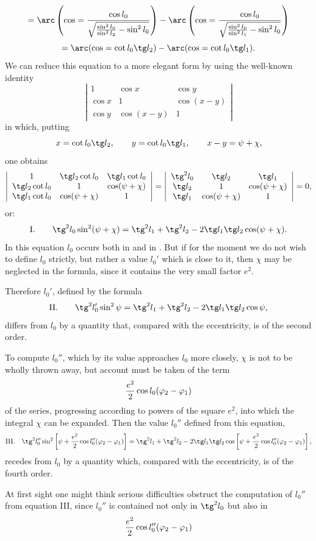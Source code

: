 \begingroup\small
\[
=\arc\left(\cos={\cos l_0\over\sqrt{{\sin^2l_0\over\sin^2l_2}-\sin^2l_0}}\right)-\arc\left(\cos={\cos l_0\over\sqrt{{\sin^2l_0\over\sin^2l_1}-\sin^2l_0}}\right)
\]
\[
=\arc(\cos=\cot l_0\tg l_2)-\arc(\cos=\cot l_0\tg l_1).
\]
We can reduce this equation to a more elegant form by using the well-known identity
\[
\left|\begin{array}{ccc}
1&\cos x&\cos y\\
\cos x&1&\cos(x-y)\\
\cos y&\cos(x-y)&1
\end{array}\right|
\]
in which, putting
\[
 x=\cot l_0\tg l_2,
 \qquad y=\cot l_0\tg l_1,
 \qquad x-y=\psi+\chi,
\]
one obtains
\[
\left|\begin{array}{ccc}
1&\tg l_2\cot l_0&\tg l_1\cot l_0\\
\tg l_2\cot l_0&1&\cos(\psi+\chi)\\
\tg l_1\cot l_0&\cos(\psi+\chi)&1
\end{array}\right|
=
\left|\begin{array}{ccc}
\tg^2l_0&\tg l_2&\tg l_1\\
\tg l_2&1&\cos(\psi+\chi)\\
\tg l_1&\cos(\psi+\chi)&1
\end{array}\right|=0,
\]
or:
\[
\text{I.}\qquad \tg^2l_0\sin^2(\psi+\chi)=\tg^2l_1+\tg^2l_2-2\tg l_1\tg l_2\cos(\psi+\chi).
\]
In this equation $l_0$ occurs both in  and in \gq{$\chi$}. But if for the moment we do not wish to define $l_0$ strictly, but rather a value $l_0'$ which is close to it, then $\chi$ may be neglected in the formula, since it contains the very small factor $e^2$.

Therefore $l_0'$, defined by the formula
\[
\text{II.}\qquad \tg^2l_0'\sin^2\psi=\tg^2l_1+\tg^2l_2-2\tg l_1\tg l_2\cos\psi,
\]
differs from $l_0$ by a quantity that, compared with the eccentricity, is of the second order.

To compute $l_0''$, which by its value approaches $l_0$ more closely, $\chi$ is not to be wholly thrown away, but account must be taken of the term
\[
 {e^2\over2}\cos l_0(\varphi_2-\varphi_1)
\]
of the series, progressing according to powers of the square $e^2$, into which the integral $\chi$ can be expanded. Then the value $l_0''$ defined from this equation,
\[
\text{III.}\quad \tg^2l_0''\sin^2\left[\psi+{e^2\over2}\cos l_0''(\varphi_2-\varphi_1)\right]
=\tg^2l_1+\tg^2l_2-2\tg l_1\tg l_2\cos\left[\psi+{e^2\over2}\cos l_0''(\varphi_2-\varphi_1)\right],
\]
recedes from $l_0$ by a quantity which, compared with the eccentricity, is of the fourth order.

At first sight one might think serious difficulties obstruct the computation of $l_0''$ from equation III, since $l_0''$ is contained not only in $\tg^2l_0$ but also in
\[
 {e^2\over2}\cos l_0''(\varphi_2-\varphi_1)
\]
\endgroup
